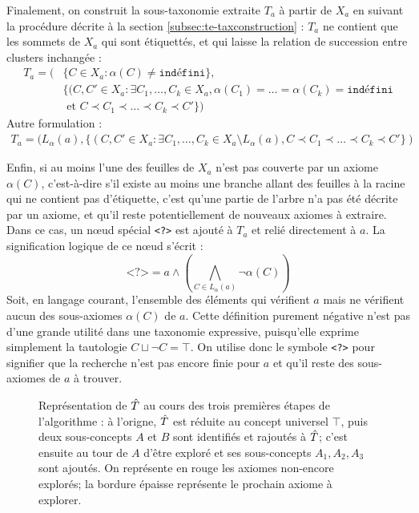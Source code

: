 Finalement, on construit la sous-taxonomie extraite $T_a$ à partir de $X_a$ en suivant la procédure décrite à la section \ref{subsec:te-taxconstruction} : $T_a$ ne contient que les sommets de $X_a$ qui sont étiquettés, et qui laisse la relation de succession entre clusters inchangée :
\begin{align}
    T_a = (&\{C \in X_a : \alpha(C) \neq \texttt{indéfini}\}, \nonumber \\
    &\{(C, C' \in X_a : \exists C_1, \ldots, C_k \in X_a, \alpha(C_1) = \ldots = \alpha(C_k) = \texttt{indéfini} \nonumber \\
    &\text{ et } C \prec C_1 \prec \ldots \prec C_k \prec C'\})
\end{align}
Autre formulation :
\begin{align}
    T_a = (L_\alpha(a), \nonumber 
    \{(C, C' \in X_a : \exists C_1, \ldots, C_k \in X_a \setminus L_\alpha(a), C \prec C_1 \prec \ldots \prec C_k \prec C'\})
\end{align}

Enfin, si au moins l'une des feuilles de $X_a$ n'est pas couverte par un axiome $\alpha(C)$, c'est-à-dire s'il existe au moins une branche allant des feuilles à la racine qui ne contient pas d'étiquette, c'est qu'une partie de l'arbre n'a pas été décrite par un axiome, et qu'il reste potentiellement de nouveaux axiomes à extraire. Dans ce cas, un nœud spécial \texttt{<?>} est ajouté à $T_a$ et relié directement à $a$. La signification logique de ce nœud s'écrit :
\begin{equation}
    \texttt{<?>} = a \land \left( \bigwedge\limits_{C \in L_\alpha(a)} \neg \alpha(C) \right)
    \label{eq:texp-special-node}
\end{equation}
Soit, en langage courant, l'ensemble des éléments qui vérifient $a$ mais ne vérifient aucun des sous-axiomes $\alpha(C)$ de $a$. Cette définition purement négative n'est pas d'une grande utilité dans une taxonomie expressive, puisqu'elle exprime simplement la tautologie $C \sqcup \neg C = \top$. On utilise donc le symbole \texttt{<?>} pour signifier que la recherche n'est pas encore finie pour $a$ et qu'il reste des sous-axiomes de $a$ à trouver.

\begin{figure}
    \centering
    
    \caption[Principe de construction récursive d'une taxonomie]{Représentation de $\hat{T}$ au cours des trois premières étapes de l'algorithme : à l'origne, $\hat{T}$ est réduite au concept universel $\top$, puis deux sous-concepts $A$ et $B$ sont identifiés et rajoutés à $\hat{T}$; c'est ensuite au tour de $A$ d'être exploré et ses sous-concepts $A_1, A_2, A_3$ sont ajoutés. On représente en rouge les axiomes non-encore explorés; la bordure épaisse représente le prochain axiome à explorer.}
    \label{fig:texp-tree-expansion}
\end{figure}


